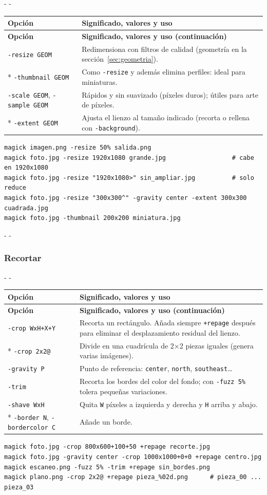 \documentclass[11pt,a4paper]{article}
\makeatletter
\newcommand{\necesitaespacio}[1]{\par\penalty-100\begingroup
	\setlength{\dimen@}{#1}\dimen@ii\pagegoal\advance\dimen@ii-\pagetotal
	\ifdim\dimen@>\dimen@ii\ifdim\dimen@ii>\z@\vfil\fi\penalty-\@M\fi\endgroup}
\newenvironment{opciones}[1][Opción]{%
	\par\begingroup\small
	\begin{longtable}{L{4.25cm}L{11.2cm}}
		\toprule\rowcolor{tablacab}\cab{#1} & \cab{Significado, valores y uso} \\ \midrule
		\endfirsthead
		\toprule\rowcolor{tablacab}\cab{#1} & \cab{Significado, valores y uso (continuación)} \\ \midrule
		\endhead
		\bottomrule
		\endfoot}
	{\end{longtable}\endgroup}
\newcommand{\opt}[1]{\texttt{\textcolor{colopt}{#1}}}      %
\newcommand{\val}[1]{\texttt{#1}}                          %
\newcommand{\cab}[1]{\textbf{#1}}
\makeatother
\begin{document}
	\necesitaespacio{14\baselineskip}
	\begin{opciones}
		\opt{-resize GEOM} & Redimensiona con filtros de calidad (geometría en la sección~\ref{sec:geometria}).\\*
		\opt{-thumbnail GEOM} & Como \opt{-resize} y además elimina perfiles: ideal para miniaturas.\\
		\opt{-scale GEOM}, \opt{-sample GEOM} & Rápidos y sin suavizado (píxeles duros); útiles para arte de píxeles.\\*
		\opt{-extent GEOM} & Ajusta el lienzo al tamaño indicado (recorta o rellena con \opt{-background}).\\
	\end{opciones}
	
	\begin{lstlisting}
magick imagen.png -resize 50% salida.png
magick foto.jpg -resize 1920x1080 grande.jpg                  # cabe en 1920x1080
magick foto.jpg -resize "1920x1080>" sin_ampliar.jpg          # solo reduce
magick foto.jpg -resize "300x300^" -gravity center -extent 300x300 cuadrada.jpg
magick foto.jpg -thumbnail 200x200 miniatura.jpg
\end{lstlisting}
	
	\necesitaespacio{22\baselineskip}
	\subsubsection{Recortar}
	
	\necesitaespacio{18\baselineskip}
	\begin{opciones}
		\opt{-crop WxH+X+Y} & Recorta un rectángulo. Añada siempre \opt{+repage} después para eliminar el desplazamiento residual del lienzo.\\*
		\opt{-crop 2x2@} & Divide en una cuadrícula de 2×2 piezas iguales (genera varias imágenes).\\
		\opt{-gravity P} & Punto de referencia: \val{center}, \val{north}, \val{southeast}\ldots\\
		\opt{-trim} & Recorta los bordes del color del fondo; con \opt{-fuzz 5\%} tolera pequeñas variaciones.\\
		\opt{-shave WxH} & Quita \val{W} píxeles a izquierda y derecha y \val{H} arriba y abajo.\\*
		\opt{-border N}, \opt{-bordercolor C} & Añade un borde.\\
	\end{opciones}
	
	\begin{lstlisting}
magick foto.jpg -crop 800x600+100+50 +repage recorte.jpg
magick foto.jpg -gravity center -crop 1000x1000+0+0 +repage centro.jpg
magick escaneo.png -fuzz 5% -trim +repage sin_bordes.png
magick plano.png -crop 2x2@ +repage pieza_%02d.png      # pieza_00 ... pieza_03
\end{lstlisting}
	
\end{document}
